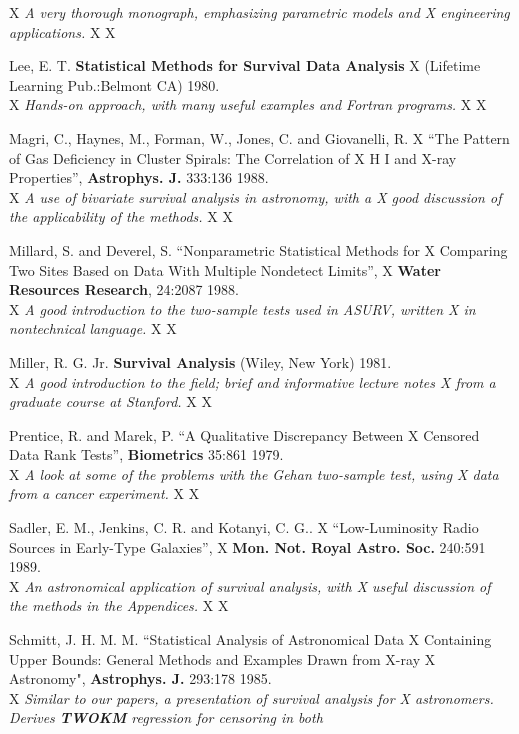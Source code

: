 \begin{description}
X    {\it A very thorough monograph, emphasizing parametric models and
X    engineering applications.}
X
X\item [] Lee, E. T. {\bf Statistical Methods for Survival Data Analysis}
X    (Lifetime Learning Pub.:Belmont CA) 1980.\\
X    {\it Hands-on approach, with many useful examples and Fortran programs.}
X
X\item [] Magri, C., Haynes, M., Forman, W., Jones, C. and Giovanelli, R.
X    ``The Pattern of Gas Deficiency in Cluster Spirals: The Correlation of
X    H I and X-ray Properties'', {\bf Astrophys. J.} 333:136 1988. \\
X    {\it A use of bivariate survival analysis in astronomy, with a
X    good discussion of the applicability of the methods.}
X
X\item [] Millard, S. and Deverel, S. ``Nonparametric Statistical Methods for
X    Comparing Two Sites Based on Data With Multiple Nondetect Limits'',
X    {\bf Water Resources Research}, 24:2087 1988. \\
X    {\it A good introduction to the two-sample tests used in ASURV, written
X    in nontechnical language.}
X
X\item [] Miller, R. G. Jr. {\bf Survival Analysis} (Wiley, New York) 1981.\\
X    {\it A good introduction to the field; brief and informative lecture notes
X    from a graduate course at Stanford.}
X
X\item [] Prentice, R. and Marek, P. ``A Qualitative Discrepancy Between 
X    Censored Data Rank Tests'', {\bf Biometrics} 35:861 1979. \\
X    {\it A look at some of the problems with the Gehan two-sample test, using
X    data from a cancer experiment.}
X
X\item[] Sadler, E. M., Jenkins, C. R.  and Kotanyi, C. G..
X    ``Low-Luminosity Radio Sources in Early-Type Galaxies'', 
X    {\bf Mon. Not. Royal Astro. Soc.} 240:591 1989. \\
X    {\it An astronomical application of survival analysis, with 
X    useful discussion of the methods in the Appendices.}
X
X\item [] Schmitt, J. H. M. M. ``Statistical Analysis of Astronomical Data 
X    Containing Upper Bounds: General Methods and Examples Drawn from X-ray 
X    Astronomy", {\bf Astrophys. J.} 293:178 1985.\\
X    {\it Similar to our papers, a presentation of survival analysis for 
X    astronomers.  Derives {\sl\bf TWOKM} regression for censoring in both 
}
\end{description}

